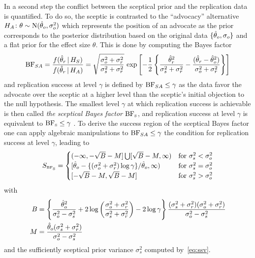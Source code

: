 \documentclass[a4paper, 11pt]{article}
\begin{document}
In a second step the conflict between the sceptical prior and the replication
data is quantified. To do so, the sceptic is contrasted to the ``advocacy''
alternative $H_{A} \colon \theta \sim \operatorname{N}(\hat{\theta}_{o}, \sigma^{2}_{o})$ which
represents the position of an advocate as the prior corresponds to the posterior
distribution based on the original data $\{\hat{\theta}_{o}, \sigma_{o}\}$ and a flat
prior for the effect size $\theta$. This is done by computing the Bayes factor
\begin{align*}
  \operatorname{BF}_{SA}
  = \frac{f(\hat{\theta}_{r} \,\vert\, H_{S})}{f(\hat{\theta}_{r} \,\vert\, H_{A})}
  = \sqrt{\frac{\sigma^{2}_{o} + \sigma^{2}_{r}}{\sigma^{2}_{s} + \sigma^{2}_{r}}}
  \, \exp\left[-\frac{1}{2}\left\{\frac{\hat{\theta}_{r}^{2}}{\sigma^{2}_{s} +
  \sigma^{2}_{r}} - \frac{(\hat{\theta}_{r} - \hat{\theta}_{o}^{2})}{\sigma^{2}_{o} +
  \sigma^{2}_{r}}\right\}\right]
\end{align*}
and replication success at level $\gamma$ is defined by $\operatorname{BF}_{SA} \leq \gamma$
as the data favor the advocate over the sceptic at a higher level than the
sceptic's initial objection to the null hypothesis. The smallest level $\gamma$
at which replication success is achievable is then called \emph{the sceptical
  Bayes factor} $\BFs$, and replication success at level $\gamma$ is equivalent
to $\text{BF}_{\scriptscriptstyle\text{S}} \leq \gamma$ \citep[see][for details on how to compute
$\BFs$]{Pawel2022b}. To derive the success region of the sceptical Bayes factor
one can apply algebraic manipulations to $\operatorname{BF}_{SA} \leq \gamma$ the condition
for replication success at level $\gamma$, leading to
\begin{align}
  \label{eq:BFssuccess}
  S_{\scriptscriptstyle \BFs}
  = \begin{cases}
    (-\infty, -\sqrt{B} - M] \bigcup [\sqrt{B} - M, \infty) & \text{for} ~ \sigma^{2}_{s} < \sigma^{2}_{o} \\
    [\that_{o} -\{(\sigma^{2}_{o} + \sigma^{2}_{r})\log\gamma\}/\that_{o}, \infty)
    & \text{for} ~ \sigma^{2}_{s} = \sigma^{2}_{o}  \\
    [-\sqrt{B} - M, \sqrt{B} - M] & \text{for} ~ \sigma^{2}_{s} > \sigma^{2}_{o}
    \end{cases}
\end{align}
with
\begin{align*}
  B &= \left\{\frac{\hat{\theta}_{o}^{2}}{\sigma^{2}_{o} - \sigma^{2}_{s}} +
      2\log\left(\frac{\sigma^{2}_{o} + \sigma^{2}_{r}}{\sigma^{2}_{s} + \sigma^{2}_{r}}\right)
      - 2\log \gamma \right\}
      \frac{(\sigma^{2}_{s} + \sigma^{2}_{r})(\sigma^{2}_{o} + \sigma^{2}_{r})}{\sigma^{2}_{o}
       - \sigma^{2}_{s}} \\
  M &= \frac{\hat{\theta}_{o} (\sigma^{2}_{s} + \sigma^{2}_{r})}{\sigma^{2}_{o} - \sigma^{2}_{s}}
\end{align*}
and the sufficiently sceptical prior variance $\sigma^{2}_{s}$ computed
by~\eqref{eq:ssv}.




\end{document}
